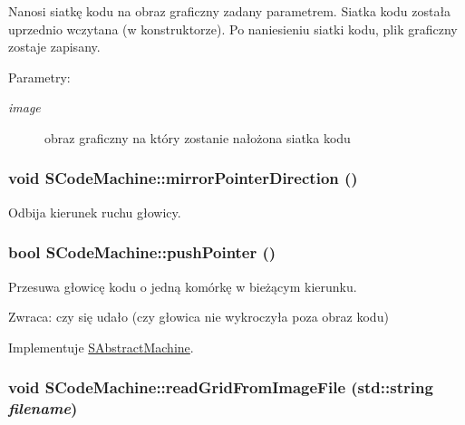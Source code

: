 Nanosi siatkę kodu na obraz graficzny zadany parametrem. Siatka kodu została uprzednio wczytana (w konstruktorze). Po naniesieniu siatki kodu, plik graficzny zostaje zapisany. \begin{Desc}
\item[Parametry:]
\begin{description}
\item[{\em image}]obraz graficzny na który zostanie nałożona siatka kodu \end{description}
\end{Desc}
\hypertarget{classSCodeMachine_2ce54a2d5f6399b501c5260b63317401}{
\subsubsection[{mirrorPointerDirection}]{\setlength{\rightskip}{0pt plus 5cm}void SCodeMachine::mirrorPointerDirection ()}}
\label{classSCodeMachine_2ce54a2d5f6399b501c5260b63317401}


Odbija kierunek ruchu głowicy. \hypertarget{classSCodeMachine_69a97f71f2a16f69f9daca1bf8433964}{
\subsubsection[{pushPointer}]{\setlength{\rightskip}{0pt plus 5cm}bool SCodeMachine::pushPointer ()}}
\label{classSCodeMachine_69a97f71f2a16f69f9daca1bf8433964}


Przesuwa głowicę kodu o jedną komórkę w bieżącym kierunku. \begin{Desc}
\item[Zwraca:]czy się udało (czy głowica nie wykroczyła poza obraz kodu) \end{Desc}


Implementuje \hyperlink{classSAbstractMachine_72a47b72416e0d2f24fcf36415d37404}{SAbstractMachine}.\hypertarget{classSCodeMachine_6796d55fa4ae7bd8051b92a60d395d2a}{
\subsubsection[{readGridFromImageFile}]{\setlength{\rightskip}{0pt plus 5cm}void SCodeMachine::readGridFromImageFile (std::string {\em filename})}}
\label{classSCodeMachine_6796d55fa4ae7bd8051b92a60d395d2a}


